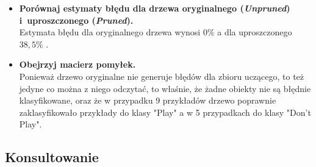 \begin{itemize}
\item \textbf{Porównaj estymaty błędu dla drzewa oryginalnego (\emph{Unpruned}) i~uproszczonego (\emph{Pruned}).}
	\\Estymata błędu dla oryginalnego drzewa wynosi  $ 0\% $ a dla uproszczonego $ 38,5\% $ .

\item \textbf{Obejrzyj macierz pomyłek.}
	\\Ponieważ drzewo oryginalne nie generuje błędów dla zbioru uczącego, to też jedyne co można z niego odczytać, to właśnie, że żadne obiekty nie są błędnie klasyfikowane, oraz że w przypadku 9 przykładów drzewo poprawnie zaklasyfikowało przykłady do klasy "Play" a w 5 przypadkach do klasy "Don't Play".

\end{itemize}

\subsection{Konsultowanie}

